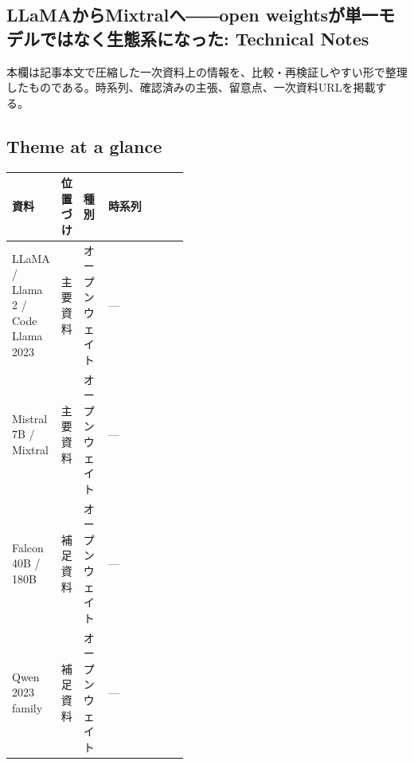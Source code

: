 \subsection*{LLaMAからMixtralへ――open weightsが単一モデルではなく生態系になった: Technical Notes}
本欄は記事本文で圧縮した一次資料上の情報を、比較・再検証しやすい形で整理したものである。時系列、確認済みの主張、留意点、一次資料URLを掲載する。
\smallskip
{}\par
\medskip
\subsection*{Theme at a glance}
\begin{center}
\footnotesize
\begin{tabularx}{\linewidth}{@{}p{0.20\linewidth}p{0.10\linewidth}p{0.14\linewidth}X@{}}
\toprule
資料 & 位置づけ & 種別 & 時系列 \\
\midrule
LLaMA / Llama 2 / Code Llama 2023 & 主要資料 & オープンウェイト & — \\
Mistral 7B / Mixtral & 主要資料 & オープンウェイト & — \\
Falcon 40B / 180B & 補足資料 & オープンウェイト & — \\
Qwen 2023 family & 補足資料 & オープンウェイト & — \\
\bottomrule
\end{tabularx}
\end{center}
\normalsize

